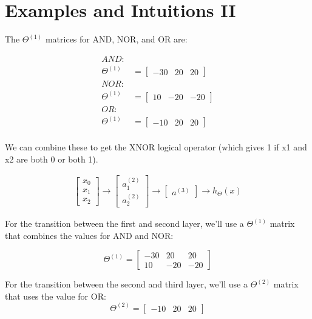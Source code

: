 \documentclass[10pt,a4paper,UTF8]{article}
\begin{document}
\section{Examples and Intuitions II}
\label{sec:org61d46d4}


The \(\Theta^{(1)}\) matrices for AND, NOR, and OR are:

\begin{align*}AND:\\\Theta^{(1)} &=\begin{bmatrix}-30 & 20 & 20\end{bmatrix} \\ NOR:\\\Theta^{(1)} &= \begin{bmatrix}10 & -20 & -20\end{bmatrix} \\ OR:\\\Theta^{(1)} &= \begin{bmatrix}-10 & 20 & 20\end{bmatrix} \\\end{align*}

We can combine these to get the XNOR logical operator (which gives 1 if x1 and x2 are both 0 or both 1).

\begin{align*}\begin{bmatrix}x_0 \\ x_1 \\ x_2\end{bmatrix} \rightarrow\begin{bmatrix}a_1^{(2)} \\ a_2^{(2)} \end{bmatrix} \rightarrow\begin{bmatrix}a^{(3)}\end{bmatrix} \rightarrow h_\Theta(x)\end{align*}

For the transition between the first and second layer, we'll use a \(\Theta^{(1)}\) matrix that combines the values for AND and NOR:

\begin{equation}
\label{eq:10}
\Theta^{(1)} =\begin{bmatrix}-30 & 20 & 20 \\ 10 & -20 & -20\end{bmatrix}
\end{equation}

For the transition between the second and third layer, we'll use a \(\Theta^{(2)}\) matrix that uses the value for OR:
\begin{equation}
\label{eq:11}
\Theta^{(2)} =\begin{bmatrix}-10 & 20 & 20\end{bmatrix}
\end{equation}
\end{document}
